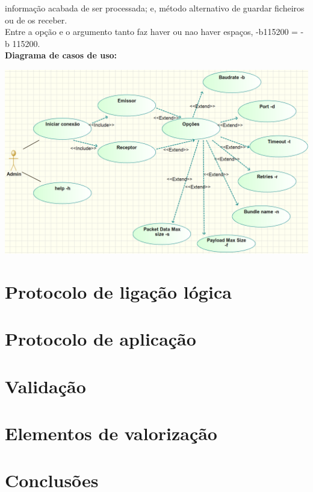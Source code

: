 \documentclass[a4paper]{article}
\begin{document}
informação acabada de ser processada; e, método alternativo de guardar
ficheiros ou de os receber.\\Entre a opção e o argumento tanto faz haver ou nao
haver espaços, -b115200 = -b 115200.
\\\newline\textbf{Diagrama de casos de uso:}\\\newline
\centerline{\includegraphics[scale=0.6]{useCases.png}}

\section{Protocolo de ligação lógica}

\section{Protocolo de aplicação}

\section{Validação}

\section{Elementos de valorização}

\section{Conclusões}
\end{document}
